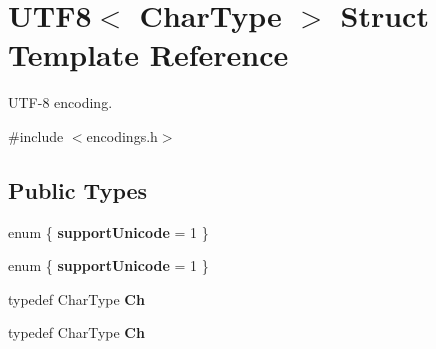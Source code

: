 \hypertarget{structUTF8}{}\section{U\+T\+F8$<$ Char\+Type $>$ Struct Template Reference}
\label{structUTF8}


U\+T\+F-\/8 encoding.  




{\ttfamily \#include $<$encodings.\+h$>$}

\subsection*{Public Types}
\begin{DoxyCompactItemize}
\item 
\mbox{\label{structUTF8_a48b25bc24e2851f5675180696982fa1c}} 
enum \{ {\bfseries support\+Unicode} = 1
 \}
\item 
\mbox{\label{structUTF8_a54c349839925144b16c3e1f24c2d1874}} 
enum \{ {\bfseries support\+Unicode} = 1
 \}
\item 
\mbox{\label{structUTF8_a8e78c8113f3660178d8121b7d3e55890}} 
typedef Char\+Type {\bfseries Ch}
\item 
\mbox{\label{structUTF8_a8e78c8113f3660178d8121b7d3e55890}} 
typedef Char\+Type {\bfseries Ch}
\end{DoxyCompactItemize}

